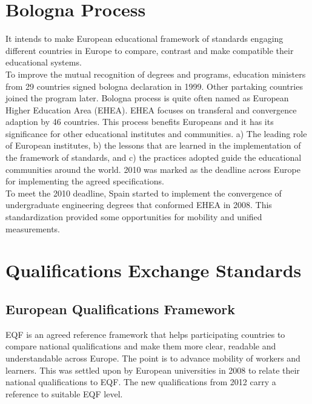 \documentclass[12pt,a4paper,oneside]{book}
\begin{document}
\section{Bologna Process}

It intends to make European educational framework of standards engaging different countries in Europe to compare, contrast and make compatible their educational systems. \cite{bologna process} \\

To improve the mutual recognition of degrees and programs, education ministers from 29 countries signed bologna declaration in 1999. Other partaking countries joined the program later. \cite{improvement bologna process} Bologna process is quite often named as European Higher Education Area (EHEA). EHEA focuses on transferal and convergence adaption by 46 countries. This process benefits Europeans and it has its significance for other educational institutes and communities. a) The leading role of European institutes, b) the lessons that are learned in the implementation of the framework of standards, and c) the practices adopted guide the educational communities around the world. 2010 was marked as the deadline across Europe for implementing the agreed specifications. \cite{European Higher Education Area } \\

To meet the 2010 deadline, Spain started to implement the convergence of undergraduate engineering degrees that conformed EHEA in 2008. This standardization provided some opportunities for mobility and unified measurements. \cite{European Higher Education Area }

\section{Qualifications Exchange Standards}

    \subsection{European Qualifications Framework}
    EQF is an agreed reference framework that helps participating countries to compare national qualifications and make them more clear, readable and understandable across Europe. The point is to advance mobility of workers and learners. This was settled upon by European universities in 2008 to relate their national qualifications to EQF. The new qualifications from 2012 carry a reference to suitable EQF level. \\
\end{document}
